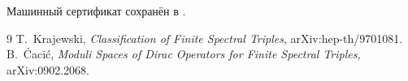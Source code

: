 Машинный сертификат сохранён в
.

\begin{thebibliography}{9}
 T.~Krajewski,
\emph{Classification of Finite Spectral Triples}, arXiv:hep-th/9701081.
 B.~\'Caci\'c,
\emph{Moduli Spaces of Dirac Operators for Finite Spectral Triples},
arXiv:0902.2068.
\end{thebibliography}